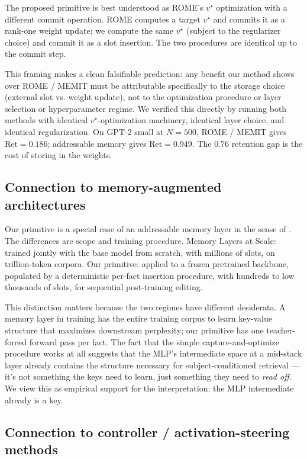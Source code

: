 \documentclass[11pt,a4paper]{article}
\newcommand{\Ret}{\text{Ret}}
\begin{document}
The proposed primitive is best understood as ROME's $v^\star$
optimization with a different commit operation. ROME computes a target
$v^\star$ and commits it as a rank-one weight update; we compute the
same $v^\star$ (subject to the regularizer choice) and commit it as a
slot insertion. The two procedures are identical up to the commit step.

This framing makes a clean falsifiable prediction: any benefit our
method shows over ROME / MEMIT must be attributable specifically to
the storage choice (external slot vs. weight update), not to the
optimization procedure or layer selection or hyperparameter regime.
We verified this directly by running both methods with identical
$v^\star$-optimization machinery, identical layer choice, and identical
regularization. On GPT-2 small at $N = 500$, ROME / MEMIT gives
$\Ret = 0.186$; addressable memory gives $\Ret = 0.949$. The
$0.76$ retention gap is the cost of storing in the weights.

\subsection{Connection to memory-augmented architectures}

Our primitive is a special case of an addressable memory layer in the
sense of \citet{berges2024memory}. The differences are scope and
training procedure. Memory Layers at Scale: trained jointly with the
base model from scratch, with millions of slots, on trillion-token
corpora. Our primitive: applied to a frozen pretrained backbone,
populated by a deterministic per-fact insertion procedure, with
hundreds to low thousands of slots, for sequential post-training
editing.

This distinction matters because the two regimes have different
desiderata. A memory layer in training has the entire training corpus
to learn key-value structure that maximizes downstream perplexity; our
primitive has one teacher-forced forward pass per fact. The fact that
the simple capture-and-optimize procedure works at all suggests that
the MLP's intermediate space at a mid-stack layer already contains
the structure necessary for subject-conditioned retrieval --- it's not
something the keys need to learn, just something they need to
\emph{read off}. We view this as empirical support for the
\citet{geva2021keyvalue} interpretation: the MLP intermediate
already is a key.

\subsection{Connection to controller / activation-steering methods}
\end{document}
